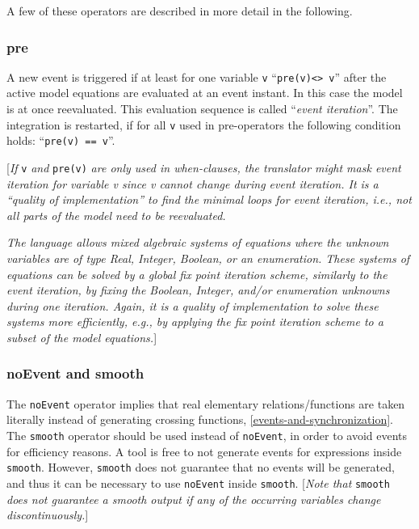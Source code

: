 A few of these operators are described in more detail in the following.

\subsubsection{pre}

A new event is triggered if at least for one variable \lstinline[basicstyle=\ttfamily]!v! ``\lstinline[basicstyle=\ttfamily]!pre(v)<> v!'' after the active model equations are
evaluated at an event instant. In this case the model is at once
reevaluated. This evaluation sequence is called ``\emph{event
iteration}''. The integration is restarted, if for all \lstinline[basicstyle=\ttfamily]!v! used in
pre-operators the following condition holds: ``\lstinline[basicstyle=\ttfamily]!pre(v) == v!''.

{[}\emph{If} \lstinline[basicstyle=\ttfamily]!v! \emph{and} \lstinline[basicstyle=\ttfamily]!pre(v)! \emph{are only used in when-clauses,
the translator might mask event iteration for variable v since v cannot
change during event iteration. It is a ``quality of implementation'' to
find the minimal loops for event iteration, i.e., not all parts of the
model need to be reevaluated. }

\emph{The language allows mixed algebraic systems of equations where the
unknown variables are of type Real, Integer, Boolean, or an enumeration.
These systems of equations can be solved by a global fix point iteration
scheme, similarly to the event iteration, by fixing the Boolean,
Integer, and/or enumeration unknowns during one iteration. Again, it is
a quality of implementation to solve these systems more efficiently,
e.g., by applying the fix point iteration scheme to a subset of the
model equations.}{]}

\subsubsection{noEvent and smooth}

The \lstinline[basicstyle=\ttfamily]!noEvent! operator implies that real elementary relations/functions
are taken literally instead of generating crossing functions, \autoref{events-and-synchronization}. 
The \lstinline[basicstyle=\ttfamily]!smooth! operator should be used instead of \lstinline[basicstyle=\ttfamily]!noEvent!, in order to
avoid events for efficiency reasons. A tool is free to not generate
events for expressions inside \lstinline[basicstyle=\ttfamily]!smooth!. However, \lstinline[basicstyle=\ttfamily]!smooth! does not guarantee
that no events will be generated, and thus it can be necessary to use
\lstinline[basicstyle=\ttfamily]!noEvent! inside \lstinline[basicstyle=\ttfamily]!smooth!. {[}\emph{Note that} \lstinline[basicstyle=\ttfamily]!smooth! \emph{does not
guarantee a smooth output if any of the occurring variables change
discontinuously.}{]}


